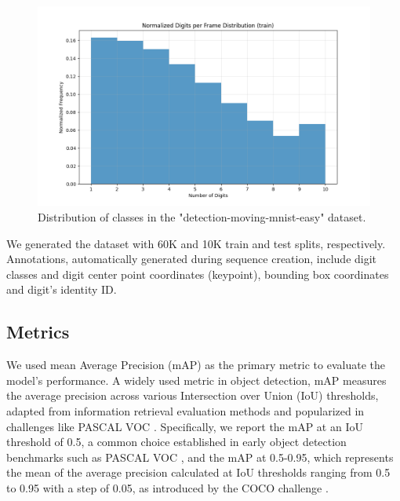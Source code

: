 \begin{figure}
    \centering
    \includegraphics[width=\textwidth]{figures/figure_method_dataset_train_digits_per_frame.png}
    \caption{Distribution of classes in the "detection-moving-mnist-easy" dataset.}
    \label{fig:figure_method_dataset_train_digits_per_frame}
\end{figure}

We generated the dataset with 60K and 10K train and test splits, respectively. Annotations, automatically generated during sequence creation, include digit classes and digit center point coordinates (keypoint), bounding box coordinates and digit's identity ID.

\subsection{Metrics} \label{Methods:Metrics}


We used mean Average Precision (mAP) as the primary metric to evaluate the model's performance. A widely used metric in object detection, mAP measures the average precision across various Intersection over Union (IoU) thresholds, adapted from information retrieval evaluation methods and popularized in challenges like PASCAL VOC \cite{everinghamPascalVisualObject2010}. Specifically, we report the mAP at an IoU threshold of 0.5, a common choice established in early object detection benchmarks such as PASCAL VOC \cite{everinghamPascalVisualObject2010}, and the mAP at 0.5-0.95, which represents the mean of the average precision calculated at IoU thresholds ranging from 0.5 to 0.95 with a step of 0.05, as introduced by the COCO challenge \cite{linMicrosoftCOCOCommon2015a}.

